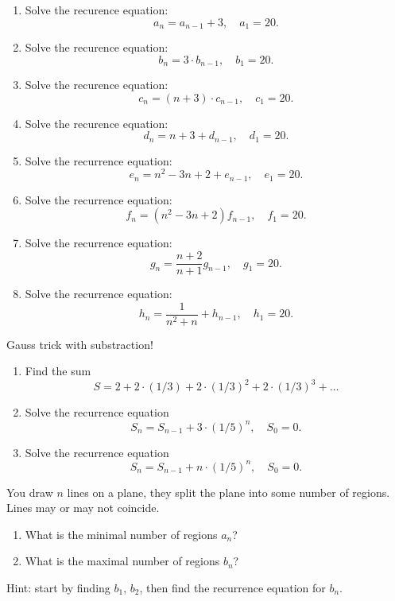 \documentclass[12pt]{article}
\begin{document}
\begin{exercise}
\begin{enumerate}[label=\alph*)]
    Recurrence equations starter pack :)
    
    \item Solve the recurence equation:
    \[
    a_n = a_{n-1} + 3, \quad a_1 = 20.
    \]

    \item Solve the recurence equation:
    \[
    b_n = 3 \cdot b_{n-1}, \quad b_1 = 20.
    \]
    \item Solve the recurence equation:
    \[
    c_n = (n+3) \cdot c_{n-1}, \quad c_1 = 20.
    \]
    \item Solve the recurence equation:
    \[
    d_n = n+3  + d_{n-1}, \quad d_1 = 20.
    \]
    \item Solve the recurrence equation:
    \[
    e_n = n^2 - 3n + 2  + e_{n-1}, \quad e_1 = 20.
    \]
    \item Solve the recurrence equation:
    \[
    f_n = (n^2 - 3n + 2) f_{n-1}, \quad f_1 = 20.
    \]
    \item Solve the recurrence equation:
    \[
    g_n = \frac{n+2}{n+1} g_{n-1}, \quad g_1 = 20.
    \]
    \item Solve the recurrence equation:
    \[
    h_n = \frac{1}{n^2 + n} + h_{n-1}, \quad h_1 = 20.
    \]
\end{enumerate}
\end{exercise}

\begin{exercise}
    Gauss trick with substraction!
    \begin{enumerate}[label=\alph*)]
        \item Find the sum
        \[
        S = 2 + 2 \cdot (1/3) + 2 \cdot (1/3)^2 + 2 \cdot (1/3)^3 + \dots
        \]
        \item Solve the recurrence equation 
        \[
        S_n = S_{n-1} + 3 \cdot (1/5)^n, \quad S_0 = 0.
        \]
        \item Solve the recurrence equation 
        \[
        S_n = S_{n-1} + n \cdot (1/5)^n, \quad S_0 = 0.
        \]
    \end{enumerate}

\end{exercise}

\begin{exercise}
You draw $n$ lines on a plane, they split the plane into some number of regions. 
Lines may or may not coincide. 
\begin{enumerate}[label=\alph*)]
    \item What is the minimal number of regions $a_n$?
    \item What is the maximal number of regions $b_n$?
\end{enumerate}
Hint: start by finding $b_1$, $b_2$, then find the recurrence equation for $b_n$. 
\end{exercise}
\end{document}
